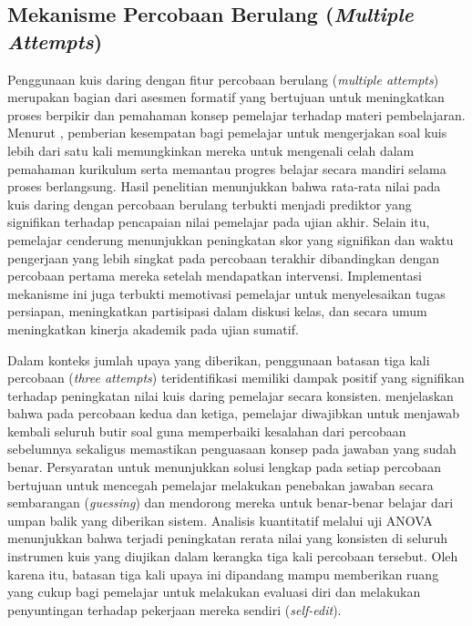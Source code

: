 \subsection{Mekanisme Percobaan Berulang (\textit{Multiple Attempts})}
\label{ssec:mekanisme_percobaan_berulang}

Penggunaan kuis daring dengan fitur percobaan berulang (\textit{multiple attempts}) merupakan bagian dari asesmen formatif yang bertujuan untuk meningkatkan proses berpikir dan pemahaman konsep pemelajar terhadap materi pembelajaran. Menurut \textcite{Mendoza2022}, pemberian kesempatan bagi pemelajar untuk mengerjakan soal kuis lebih dari satu kali memungkinkan mereka untuk mengenali celah dalam pemahaman kurikulum serta memantau progres belajar secara mandiri selama proses berlangsung. Hasil penelitian menunjukkan bahwa rata-rata nilai pada kuis daring dengan percobaan berulang terbukti menjadi prediktor yang signifikan terhadap pencapaian nilai pemelajar pada ujian akhir. Selain itu, pemelajar cenderung menunjukkan peningkatan skor yang signifikan dan waktu pengerjaan yang lebih singkat pada percobaan terakhir dibandingkan dengan percobaan pertama mereka setelah mendapatkan intervensi. Implementasi mekanisme ini juga terbukti memotivasi pemelajar untuk menyelesaikan tugas persiapan, meningkatkan partisipasi dalam diskusi kelas, dan secara umum meningkatkan kinerja akademik pada ujian sumatif.

Dalam konteks jumlah upaya yang diberikan, penggunaan batasan tiga kali percobaan (\textit{three attempts}) teridentifikasi memiliki dampak positif yang signifikan terhadap peningkatan nilai kuis daring pemelajar secara konsisten. \textcite{Mendoza2022} menjelaskan bahwa pada percobaan kedua dan ketiga, pemelajar diwajibkan untuk menjawab kembali seluruh butir soal guna memperbaiki kesalahan dari percobaan sebelumnya sekaligus memastikan penguasaan konsep pada jawaban yang sudah benar. Persyaratan untuk menunjukkan solusi lengkap pada setiap percobaan bertujuan untuk mencegah pemelajar melakukan penebakan jawaban secara sembarangan (\textit{guessing}) dan mendorong mereka untuk benar-benar belajar dari umpan balik yang diberikan sistem. Analisis kuantitatif melalui uji ANOVA menunjukkan bahwa terjadi peningkatan rerata nilai yang konsisten di seluruh instrumen kuis yang diujikan dalam kerangka tiga kali percobaan tersebut. Oleh karena itu, batasan tiga kali upaya ini dipandang mampu memberikan ruang yang cukup bagi pemelajar untuk melakukan evaluasi diri dan melakukan penyuntingan terhadap pekerjaan mereka sendiri (\textit{self-edit}).

